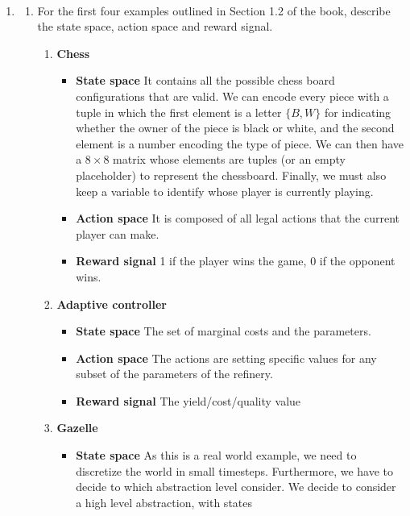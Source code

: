 \documentclass{exam}
\begin{document}
\begin{problem}
\ \newline
\begin{enumerate}
\item 
\begin{enumerate}
    \item For the first four examples outlined in Section 1.2 of the book, describe the state space, action space and reward signal.
    \begin{solutionorlines}[2in]

        \begin{enumerate}
        	\item \textbf{Chess}
        		\begin{itemize}
        			\item \textbf{State space} It contains all the possible chess board configurations that are valid. We can encode every piece with a tuple in which the first element is a letter $\{B, W\}$ for indicating whether the owner of the piece is black or white, and the second element is a number encoding the type of piece. We can then have a $8\times8$ matrix whose elements are tuples (or an empty placeholder) to represent the chessboard. Finally, we must also keep a variable to identify whose player is currently playing.
        			\item \textbf{Action space} It is composed of all legal actions that the current player can make.
        			\item \textbf{Reward signal} 1 if the player wins the game, 0 if the opponent wins.
        		\end{itemize}
        	\item \textbf{Adaptive controller}
        	\begin{itemize}
        		\item \textbf{State space} The set of marginal costs and the parameters.
        		\item \textbf{Action space} The actions are setting specific values for any subset of the parameters of the refinery.
        		\item \textbf{Reward signal} The yield/cost/quality value
        	\end{itemize}
        	\item \textbf{Gazelle}
        	\begin{itemize}
        		\item \textbf{State space} As this is a real world example, we need to discretize the world in small timesteps. Furthermore, we have to decide to which abstraction level consider. We decide to consider a high level abstraction, with states 

\end{itemize}
\end{enumerate}
\end{solutionorlines}
\end{enumerate}
\end{enumerate}
\end{problem}
\end{document}
